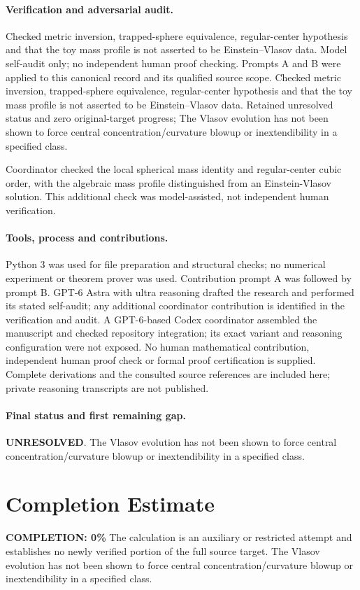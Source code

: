 \documentclass[11pt]{article}
\begin{document}
\paragraph{Verification and adversarial audit.}
Checked metric inversion, trapped-sphere equivalence, regular-center hypothesis and that the toy mass profile is not asserted to be Einstein–Vlasov data. Model self-audit only; no independent human proof checking. Prompts A and B were applied to this canonical record and its qualified source scope. Checked metric inversion, trapped-sphere equivalence, regular-center hypothesis and that the toy mass profile is not asserted to be Einstein–Vlasov data. Retained unresolved status and zero original-target progress; The Vlasov evolution has not been shown to force central concentration/curvature blowup or inextendibility in a specified class.

Coordinator checked the local spherical mass identity and regular-center cubic order, with the algebraic mass profile distinguished from an Einstein-Vlasov solution. This additional check was model-assisted, not independent human verification.

\paragraph{Tools, process and contributions.}
Python 3 was used for file preparation and structural checks; no numerical experiment or theorem prover was used. Contribution prompt A was followed by prompt B. GPT-6 Astra with ultra reasoning drafted the research and performed its stated self-audit; any additional coordinator contribution is identified in the verification and audit. A GPT-6-based Codex coordinator assembled the manuscript and checked repository integration; its exact variant and reasoning configuration were not exposed. No human mathematical contribution, independent human proof check or formal proof certification is supplied. Complete derivations and the consulted source references are included here; private reasoning transcripts are not published.

\paragraph{Final status and first remaining gap.}
\textbf{UNRESOLVED}. The Vlasov evolution has not been shown to force central concentration/curvature blowup or inextendibility in a specified class.

\section{Completion Estimate}
\noindent\textbf{COMPLETION: 0\%}
The calculation is an auxiliary or restricted attempt and establishes no newly verified portion of the full source target. The Vlasov evolution has not been shown to force central concentration/curvature blowup or inextendibility in a specified class.
\end{document}
